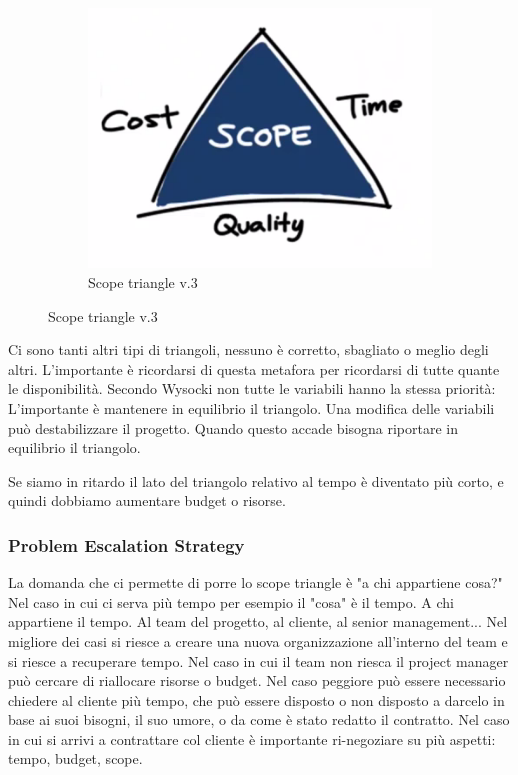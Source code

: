 \begin{figure}[H]
\begin{subfigure}{.3\textwidth}
		\centering
		\includegraphics[width=\linewidth]{document/img/triangle3.PNG}
		\caption{Scope triangle v.3}
	\end{subfigure}
\end{figure}

\noindent Ci sono tanti altri tipi di triangoli, nessuno è corretto, sbagliato o meglio degli altri. L'importante è ricordarsi di questa metafora per ricordarsi di tutte quante le disponibilità. Secondo Wysocki non tutte le variabili hanno la stessa priorità:
\noindent L'importante è mantenere in equilibrio il triangolo. Una modifica delle variabili può destabilizzare il progetto. Quando questo accade bisogna riportare in equilibrio il triangolo.
\begin{info}[Esempio]
	Se siamo in ritardo il lato del triangolo relativo al tempo è diventato più corto, e quindi dobbiamo aumentare budget o risorse.
\end{info}
\subsubsection{Problem Escalation Strategy}
La domanda che ci permette di porre lo scope triangle è "a chi appartiene cosa?"\newline
Nel caso in cui ci serva più tempo per esempio il "cosa" è il tempo. A chi appartiene il tempo. Al team del progetto, al cliente, al senior management...
Nel migliore dei casi si riesce a creare una nuova organizzazione all'interno del team e si riesce a recuperare tempo. Nel caso in cui il team non riesca il project manager può cercare di riallocare risorse o budget. Nel caso peggiore può essere necessario chiedere al cliente più tempo, che può essere disposto o non disposto a darcelo in base ai suoi bisogni, il suo umore, o da come è stato redatto il contratto. Nel caso in cui si arrivi a contrattare col cliente è importante ri-negoziare su più aspetti: tempo, budget, scope.
